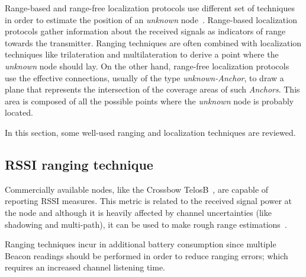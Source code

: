 Range-based and range-free localization protocols use different set of techniques in order to estimate the position of an \emph{unknown} node~\cite{rang:loc:techniques}. Range-based localization protocols gather information about the received signals as indicators of range towards the transmitter. Ranging techniques are often combined with localization techniques like trilateration and multilateration to derive a point where the \emph{unknown} node should lay. On the other hand, range-free localization protocols use the effective connections, usually of the type \emph{unknown-Anchor}, to draw a plane that represents the intersection of the coverage areas of such \emph{Anchors}. This area is composed of all the possible points where the \emph{unknown} node is probably located.

In this section, some well-used ranging and localization techniques are reviewed.

\subsection{RSSI ranging technique} \label{rssi}
Commercially available nodes, like the Crossbow TelosB~\cite{telosB}, are capable of reporting RSSI measures. This metric is related to the received signal power at the node and although it is heavily affected by channel uncertainties (like shadowing and multi-path), it can be used to make rough range estimations~\cite{rang:loc:techniques}.

% 

Ranging techniques incur in additional battery consumption since multiple Beacon readings should be performed in order to reduce ranging errors; which requires an increased channel listening time.

